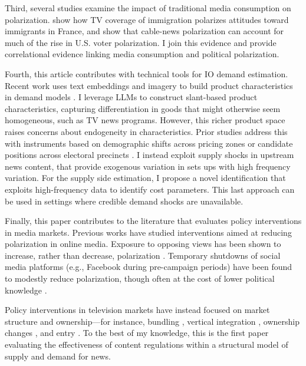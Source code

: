 \documentclass[12pt]{article}
\begin{document}
 
Third, several studies examine the impact of traditional media consumption on polarization. \citet{schneider2025media} show how TV coverage of immigration polarizes attitudes toward immigrants in France, and \citet{martin2017} show that cable-news polarization can account for much of the rise in U.S. voter polarization. I join this evidence and provide correlational evidence linking media consumption and political polarization. 




Fourth, this article contributes with technical tools for IO demand estimation. Recent work uses text embeddings and imagery to build product characteristics in demand models \citep{compiani2025demandestimationtextimage}. I leverage LLMs to construct slant-based product characteristics, capturing differentiation in goods that might otherwise seem homogeneous, such as TV news programs. However, this richer product space raises concerns about endogeneity in characteristics. Prior studies address this with instruments based on demographic shifts across pricing zones \citep{fan} or candidate positions across electoral precincts \citep{longuet-marx2025party}. I instead exploit supply shocks in upstream news content, that provide exogenous variation in sets ups with high frequency variation. For the supply side estimation, I propose a novel identification that exploits high-frequency data to identify cost parameters. This last approach can be used in settings where credible demand shocks are unavailable. 


Finally, this paper contributes to the literature that evaluates policy interventions in media markets. Previous works have studied interventions aimed at reducing polarization in online media. Exposure to opposing views has been shown to increase, rather than decrease, polarization \citep{bail2018exposure}. Temporary shutdowns of social media platforms (e.g., Facebook during pre-campaign periods) have been found to modestly reduce polarization, though often at the cost of lower political knowledge \citep{Allcott2024TheEO}.


Policy interventions in television markets have instead focused on market structure and ownership—for instance, bundling \citep{crawford_yurukoglu}, vertical integration \citep{crawford_vertical}, ownership changes \citep{MARTIN_McCRAIN_2019,CageHengelHerveUrvoy2022}, and entry \citep{prat_stromberg_entry}. To the best of my knowledge, this is the first paper evaluating the effectiveness of content regulations within a structural model of supply and demand for news.
\end{document}
